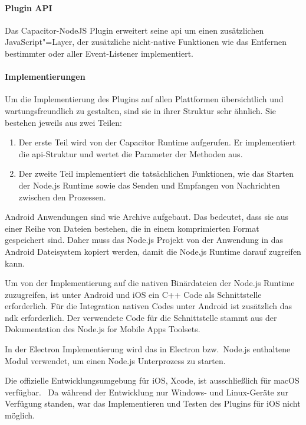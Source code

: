 \newpage

\paragraph{Plugin API}

Das Capacitor-NodeJS Plugin erweitert seine \ac{api} um einen zusätzlichen JavaScript"=Layer, der zusätzliche nicht-native Funktionen wie das Entfernen bestimmter oder aller Event-Listener implementiert.

\paragraph{Implementierungen}

Um die Implementierung des Plugins auf allen Plattformen übersichtlich und wartungsfreundlich zu gestalten, sind sie in ihrer Struktur sehr ähnlich.
Sie bestehen jeweils aus zwei Teilen:

\begin{enumerate}
    \item Der erste Teil wird von der Capacitor Runtime aufgerufen. Er implementiert die \acs{api}-Struktur und wertet die Parameter der Methoden aus.
    \item Der zweite Teil implementiert die tatsächlichen Funktionen, wie das Starten der Node.js Runtime sowie das Senden und Empfangen von Nachrichten zwischen den Prozessen.
\end{enumerate}

Android Anwendungen sind wie Archive aufgebaut.
Das bedeutet, dass sie aus einer Reihe von Dateien bestehen, die in einem komprimierten Format gespeichert sind.
Daher muss das Node.js Projekt von der Anwendung in das Android Dateisystem kopiert werden, damit die Node.js Runtime darauf zugreifen kann.
\cite{nodejs-mobile:docs}

Um von der Implementierung auf die nativen Binärdateien der Node.js Runtime zuzugreifen, ist unter Android und iOS ein C++ Code als Schnittstelle erforderlich.
Für die Integration nativen Codes unter Android ist zusätzlich das \ac{ndk} erforderlich.
Der verwendete Code für die Schnittstelle stammt aus der Dokumentation des Node.js for Mobile Apps Toolsets.
\cite{nodejs-mobile:docs}

In der Electron Implementierung wird das in Electron bzw.\ Node.js enthaltene Modul  verwendet, um einen Node.js Unterprozess zu starten.

\begin{note}
    Die offizielle Entwicklungsumgebung für iOS, Xcode, ist ausschließlich für macOS verfügbar.~\cite{xcode:support}
    Da während der Entwicklung nur Windows- und Linux-Geräte zur Verfügung standen, war das Implementieren und Testen des Plugins für iOS nicht möglich.
\end{note}

